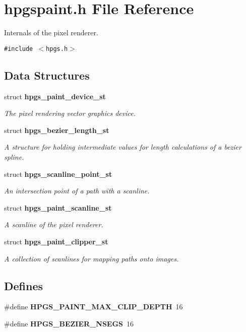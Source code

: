 \section{hpgspaint.h File Reference}
\label{hpgspaint_8h}
Internals of the pixel renderer. 

{\tt \#include $<$hpgs.h$>$}\par
\subsection*{Data Structures}
\begin{CompactItemize}
\item 
struct {\bf hpgs\_\-paint\_\-device\_\-st}
\begin{CompactList}\small\item\em The pixel rendering vector graphics device. \item\end{CompactList}\item 
struct {\bf hpgs\_\-bezier\_\-length\_\-st}
\begin{CompactList}\small\item\em A structure for holding intermediate values for length calculations of a bezier spline. \item\end{CompactList}\item 
struct {\bf hpgs\_\-scanline\_\-point\_\-st}
\begin{CompactList}\small\item\em An intersection point of a path with a scanline. \item\end{CompactList}\item 
struct {\bf hpgs\_\-paint\_\-scanline\_\-st}
\begin{CompactList}\small\item\em A scanline of the pixel renderer. \item\end{CompactList}\item 
struct {\bf hpgs\_\-paint\_\-clipper\_\-st}
\begin{CompactList}\small\item\em A collection of scanlines for mapping paths onto images. \item\end{CompactList}\end{CompactItemize}
\subsection*{Defines}
\begin{CompactItemize}
\item 
\#define \textbf{HPGS\_\-PAINT\_\-MAX\_\-CLIP\_\-DEPTH}~16\label{group__paint__device_gf6c109765736c6286c304392398ab3c5}

\item 
\#define \textbf{HPGS\_\-BEZIER\_\-NSEGS}~16\label{group__path_gc1e1b2309958cace37208a8072ac9f4f}

\end{CompactItemize}
